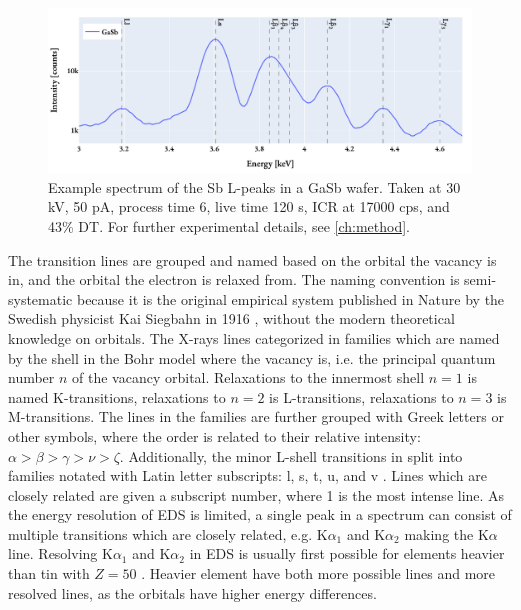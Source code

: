 \begin{figure}[p]
    \centering
    \includegraphics[width=0.99\linewidth]{figures/Sb_L-peaks_30kV_50pA.pdf}
    \caption{
        Example spectrum of the Sb L-peaks in a GaSb wafer.
        Taken at 30 kV, 50 pA, process time 6, live time 120 s, ICR at 17000 cps, and 43\% DT.
        For further experimental details, see \cref{ch:method}.
    }
    \label{fig:theory:xray_formation:Sb_L-peaks}
\end{figure}




The transition lines are grouped and named based on the orbital the vacancy is in, and the orbital the electron is relaxed from.
The naming convention is semi-systematic because it is the original empirical system published in Nature by the Swedish physicist Kai Siegbahn in 1916 \cite{siegbahn_relations_1916}, without the modern theoretical knowledge on orbitals.
The X-rays lines categorized in families which are named by the shell in the Bohr model where the vacancy is, i.e. the principal quantum number $n$ of the vacancy orbital.
Relaxations to the innermost shell $n=1$ is named K-transitions, relaxations to $n=2$ is L-transitions, relaxations to $n=3$ is M-transitions.
The lines in the families are further grouped with Greek letters or other symbols, where the order is related to their relative intensity: $\alpha > \beta > \gamma > \nu > \zeta$.
Additionally, the minor L-shell transitions in split into families notated with Latin letter subscripts: l, s, t, u, and v \cite[Ch. 4.2.4]{goldstein_scanning_2018}.
Lines which are closely related are given a subscript number, where 1 is the most intense line.
As the energy resolution of EDS is limited, a single peak in a spectrum can consist of multiple transitions which are closely related, e.g. K$\alpha_1$ and K$\alpha_2$ making the K$\alpha$ line.
Resolving K$\alpha_1$ and K$\alpha_2$ in EDS is usually first possible for elements heavier than tin with $ Z = 50$ \cite[Ch. 8.2.2.3]{hollas_modern_2004}. %
Heavier element have both more possible lines and more resolved lines, as the orbitals have higher energy differences.



